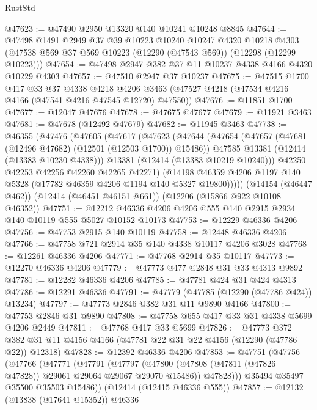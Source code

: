 \begin{lexlean}{RustStd}
\begin{coremodule}
@47623 := @47490 @2950 @13320 @140 @10241 @10248 @8845
@47644 := @47498
    @1491
    @2949
    @37
    @39
    @10223
    @10240
    @10247
    @4320
    @10218
    @4303
    (@47538 @569 @37 @569 @10223 (@12290 (@47543 @569)) (@12298 (@12299 @10223)))
@47654 := @47498 @2947 @382 @37 @11 @10237 @4338 @4166 @4320 @10229 @4303
@47657 := @47510 @2947 @37 @10237
@47675 := @47515
    @1700
    @417
    @33
    @37
    @4338
    @4218
    @4206
    @3463
    (@47527 @4218 (@47534 @4216 @4166 (@47541 @4216 @47545 @12720) @47550))
@47676 := @11851 @1700
@47677 := @12047 @47676
@47678 := @47675 @47677
@47679 := @11921 @3463
@47681 := @47678 (@12492 @47679)
@47682 := @11945 @3463
@47738 := @46355
    (@47476
      (@47605
        (@47617
          (@47623
            (@47644
              (@47654
                (@47657 (@47681 (@12496 @47682) (@12501 (@12503 @1700)) @15486))
                @47585
                @13381
                (@12414 (@13383 @10230 @4338)))
              @13381
              (@12414 (@13383 @10219 @10240)))
            @42250
            @42253
            @42256
            @42260
            @42265
            @42271)
          (@14198 @46359 @4206 @1197 @140 @5328 (@17782 @46359 @4206 @1194 @140 @5327 @19800)))))
    (@14154 (@46447 @462))
    (@12414 (@46451 @46151 @661))
    (@12206 (@15866 @922 @10108 @46352))
@47751 := @12212 @46336 @4206 @4206 @555 @140 @2915 @2934 @140 @10119 @555 @5027 @10152 @10173
@47753 := @12229 @46336 @4206
@47756 := @47753 @2915 @140 @10119
@47758 := @12448 @46336 @4206
@47766 := @47758 @721 @2914 @35 @140 @4338 @10117 @4206 @3028
@47768 := @12261 @46336 @4206
@47771 := @47768 @2914 @35 @10117
@47773 := @12270 @46336 @4206
@47779 := @47773 @477 @2848 @31 @33 @4313 @9892
@47781 := @12282 @46336 @4206
@47785 := @47781 @424 @31 @424 @4313
@47786 := @12291 @46336
@47791 := @47779 (@47785 (@12290 (@47786 @424)) @13234)
@47797 := @47773 @2846 @382 @31 @11 @9890 @4166
@47800 := @47753 @2846 @31 @9890
@47808 := @47758 @655 @417 @33 @31 @4338 @5699 @4206 @2449
@47811 := @47768 @417 @33 @5699
@47826 := @47773
    @372
    @382
    @31
    @11
    @4156
    @4166
    (@47781 @22 @31 @22 @4156 (@12290 (@47786 @22)) @12318)
@47828 := @12392 @46336 @4206
@47853 := @47751
    (@47756
      (@47766
        (@47771
          (@47791
            (@47797
              (@47800 (@47808 (@47811 (@47826 @47828)) @29061 @29064 @29067 @29070 @15486))
              @47828)))
        @35494
        @35497
        @35500
        @35503
        @15486))
    (@12414 (@12415 @46336 @555))
@47857 := @12132 (@13838 (@17641 @15352)) @46336

\end{coremodule}
\end{lexlean}
